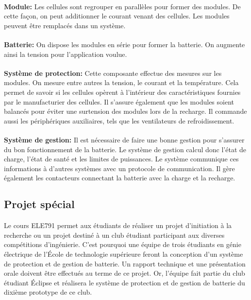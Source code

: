 	\paragraph{}   \textbf{Module:}
	 Les cellules sont regrouper en parallèles pour former des modules. De cette façon, on peut additionner le courant venant des cellules. Les modules peuvent être remplacés dans un système.
	
	\paragraph{}   \textbf{Batterie:}
	 On dispose les modules en série pour former la batterie. On augmente ainsi la tension pour l'application voulue.
	
	\paragraph{}   \textbf{Système de protection:}
	 Cette composante effectue des mesures sur les modules. On mesure entre autres la tension, le courant et la température. Cela permet de savoir si les cellules opèrent à l'intérieur des caractéristiques fournies par le manufacturier des cellules. Il s'assure également que les modules soient balancés pour éviter une surtension des modules lors de la recharge. Il commande aussi les périphériques auxiliaires, tels que les ventilateurs de refroidissement.
	
	\paragraph{}   \textbf{Système de gestion:}
	 Il est nécessaire de faire une bonne gestion pour s'assurer du bon fonctionnement de la batterie. Le système de gestion calcul donc l'état de charge, l'état de santé et les limites de puissances. Le système communique ces informations à d'autres systèmes avec un protocole de communication. Il gère également les contacteurs connectant la batterie avec la charge et la recharge.
	
	\subsection{Projet spécial}
	\paragraph{}
	Le cours ELE791 permet aux étudiants de réaliser un projet d'initiation à la recherche ou un projet destiné à un club étudiant participant aux diverses compétitions d'ingénierie. C'est pourquoi une équipe de trois étudiants en génie électrique de l'École de technologie supérieure feront la conception d'un système de protection et de gestion de batterie. Un rapport technique et une présentation orale doivent être effectués au terme de ce projet. Or, l'équipe fait partie du club étudiant Éclipse et réalisera le système de protection et de gestion de batterie du dixième prototype de ce club.
	
